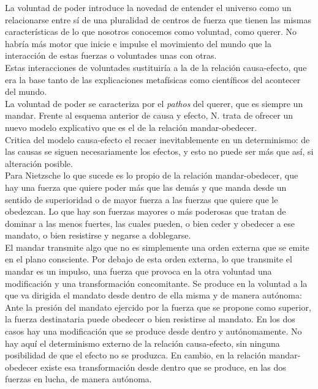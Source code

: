 \documentclass[a4paper, 10pt, twocolumn, spanish]{article}
\begin{document}
La voluntad de poder introduce la novedad de entender el universo como
un relacionarse entre sí de una pluralidad de centros de fuerza que
tienen las mismas características de lo que nosotros conocemos como
voluntad, como querer. No habría más motor que inicie e impulse el
movimiento del mundo que la interacción de estas fuerzas o voluntades
unas con otras.\\[0pt]
Estas interacciones de voluntades sustituiría a la de la relación
causa-efecto, que era la base tanto de las explicaciones metafísicas
como científicos del acontecer del mundo.\\[0pt]

La voluntad de poder se caracteriza por el \emph{pathos} del querer, que es
siempre un mandar. Frente al esquema anterior de causa y efecto,
N. trata de ofrecer un nuevo modelo explicativo que es el de la
relación mandar-obedecer.\\[0pt]
Critica del modelo causa-efecto el recaer inevitablemente en un
determinismo: de las causas se siguen necesariamente los efectos, y
esto no puede ser más que así, si alteración posible.\\[0pt]

Para Nietzsche lo que sucede es lo propio de la relación
mandar-obedecer, que hay una fuerza que quiere poder más que las demás
y que manda desde un sentido de superioridad o de mayor fuerza a las
fuerzas que quiere que le obedezcan. Lo que hay son fuerzas mayores o
más poderosas que tratan de dominar a las menos fuertes, las cuales
pueden, o bien ceder y obedecer a ese mandato, o bien resistirse y
negarse a doblegarse.\\[0pt]

El mandar transmite algo que no es simplemente una orden externa que
se emite en el plano consciente. Por debajo de esta orden externa, lo
que transmite el mandar es un impulso, una fuerza que provoca en la
otra voluntad una modificación y una transformación concomitante. Se
produce en la voluntad a la que va dirigida el mandato desde dentro de
ella misma y de manera autónoma: Ante la presión del mandato ejercido
por la fuerza que se propone como superior, la fuerza destinataria
puede obedecer o bien resistirse al mandato. En los dos casos hay una
modificación que se produce desde dentro y autónomamente. No hay aquí
el determinismo externo de la relación causa-efecto, sin ninguna
posibilidad de que el efecto no se produzca. En cambio, en la relación
mandar-obedecer existe esa transformación desde dentro que se produce,
en las dos fuerzas en lucha, de manera autónoma.\\[0pt]
\end{document}

